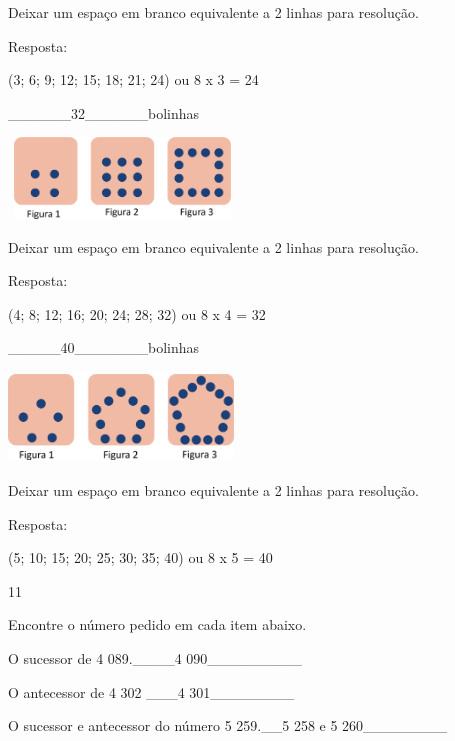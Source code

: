 Deixar um espaço em branco equivalente a 2 linhas para resolução.

Resposta:

(3; 6; 9; 12; 15; 18; 21; 24) ou 8 x 3 = 24

\begin{escolha}

\item
  \_\_\_\_\_\_32\_\_\_\_\_\_bolinhas
\end{escolha}

\includegraphics[width=2.38354in,height=0.85007in]{media/image34.png}

Deixar um espaço em branco equivalente a 2 linhas para resolução.

Resposta:

(4; 8; 12; 16; 20; 24; 28; 32) ou 8 x 4 = 32

\begin{escolha}

\item
  \_\_\_\_\_40\_\_\_\_\_\_\_bolinhas
\end{escolha}

\includegraphics[width=2.35854in,height=0.94175in]{media/image35.png}

Deixar um espaço em branco equivalente a 2 linhas para resolução.

Resposta:

(5; 10; 15; 20; 25; 30; 35; 40) ou 8 x 5 = 40

\num{11}

Encontre o número pedido em cada item abaixo.

\begin{escolha}

\item
  O sucessor de 4 089.\_\_\_\_4 090\_\_\_\_\_\_\_\_\_
\item
  O antecessor de 4 302 \_\_\_4 301\_\_\_\_\_\_\_\_
\item
  O sucessor e antecessor do número 5 259.\_\_5 258 e 5
  260\_\_\_\_\_\_\_\_
\end{escolha}

